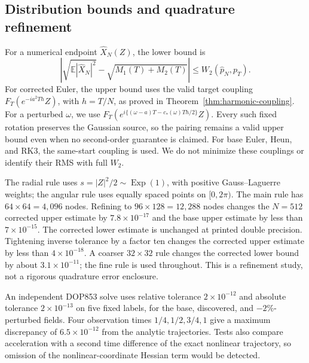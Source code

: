 \subsection{Distribution bounds and quadrature refinement}
For a numerical endpoint $\widehat X_N(Z)$, the lower bound is
\[
 \left|\sqrt{\mathbb E|\widehat X_N|^2}
       -\sqrt{M_1(T)+M_2(T)}\right|\le W_2(\widehat p_N,p_T).
\]
For corrected Euler, the upper bound uses the valid target coupling
$F_T(e^{-ia^2Th}Z)$, with $h=T/N$, as proved in Theorem~\ref{thm:harmonic-coupling}. For a perturbed $\omega$, we use
$F_T(e^{i\{(\omega-a)T-c_*(\omega)Th/2\}}Z)$.
Every such fixed rotation preserves the Gaussian source, so the pairing remains a valid upper bound even when no second-order guarantee is claimed. For base Euler, Heun, and RK3, the same-start coupling is used. We do not minimize these couplings or identify their RMS with full $W_2$.

The radial rule uses $s=|Z|^2/2\sim\operatorname{Exp}(1)$, with positive Gauss--Laguerre weights; the angular rule uses equally spaced points on $[0,2\pi)$. The main rule has $64\times64=4{,}096$ nodes. Refining to $96\times128=12{,}288$ nodes changes the $N=512$ corrected upper estimate by $7.8\times10^{-17}$ and the base upper estimate by less than $7\times10^{-15}$. The corrected lower estimate is unchanged at printed double precision. Tightening inverse tolerance by a factor ten changes the corrected upper estimate by less than $4\times10^{-18}$. A coarser $32\times32$ rule changes the corrected lower bound by about $3.1\times10^{-11}$; the fine rule is used throughout. This is a refinement study, not a rigorous quadrature error enclosure.

An independent DOP853 solve uses relative tolerance $2\times10^{-12}$ and absolute tolerance $2\times10^{-13}$ on five fixed labels, for the base, discovered, and $-2\%$-perturbed fields. Four observation times $1/4,1/2,3/4,1$ give a maximum discrepancy of $6.5\times10^{-12}$ from the analytic trajectories. Tests also compare acceleration with a second time difference of the exact nonlinear trajectory, so omission of the nonlinear-coordinate Hessian term would be detected.

